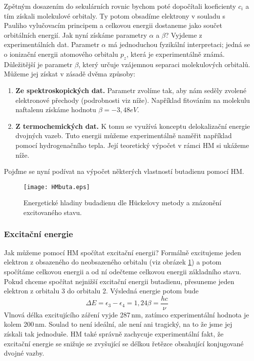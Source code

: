 Zpětným dosazením do sekulárních rovnic bychom poté dopočítali koeficienty $c_i$ a tím získali molekulové orbitaly. Ty potom obsadíme elektrony v souladu s Pauliho vylučovacím principem a celkovou energii dostaneme jako součet orbitálních energií. 
Jak nyní získáme parametry $\alpha$ a $\beta$? Vyjdeme z experimentálních dat. Parametr $\alpha$ má jednoduchou fyzikální interpretaci; jedná se o ionizační energii atomového orbitalu $p_z$, která je experimentálně známá. Důležitější je parametr $\beta$, který určuje vzájemnou separaci molekulových orbitalů. Můžeme jej získat v zásadě dvěma způsoby:
\begin{enumerate}
\item \textbf{Ze spektroskopických dat.} Parametr zvolíme tak, aby nám seděly zvolené elektronové přechody (podrobnosti viz níže). Například fitováním na molekulu naftalenu získáme hodnotu $\beta=-3,48 eV$.
\item \textbf{Z termochemických dat.} K tomu se využívá konceptu delokalizační energie dvojných vazeb. Tuto energii můžeme experimentálně naměřit například pomocí hydrogenačního tepla. Její teoretický výpočet v rámci HM si ukážeme níže. 
\end{enumerate}

Pojďme se nyní podívat na výpočet některých vlastností butadienu pomocí HM. 

\begin{figure}
\centering
\texttt{[image: HMbuta.eps]}
\caption[Energetické hladiny butadienu]{Energetické hladiny budadienu dle H\"{u}ckelovy metody a znázonění excitovaného stavu.}
\label{obr:HMbuta}
\end{figure}

\subsubsection{Excitační energie}

Jak můžeme pomocí HM spočítat excitační energii? Formálně excitujeme jeden elektron z obsazeného do neobsazeného orbitalu (viz obrázek \ref{obr:HMbuta}) a potom spočítáme celkovou energii a od ní odečteme celkovou energii základního stavu. Pokud chceme spočítat nejnižší excitační energii butadienu, přesuneme jeden elektron z orbitalu 3 do orbitalu 2. Výsledná energie potom bude
$$
\Delta E = \epsilon_3-\epsilon_4 = 1,24 \beta = \frac{hc}{\nu} 
$$
Vlnová délka excitujícího záření vyjde 287\,nm, zatímco experimentální hodnota je kolem 200\,nm.
Soulad to není ideální, ale není ani tragický, na to že jsme jej získali tak jednoduše. HM také správně zachycuje experimentální fakt, že excitační energie se snižuje se zvyšující se délkou řetězce obsahující konjugované dvojné vazby.

